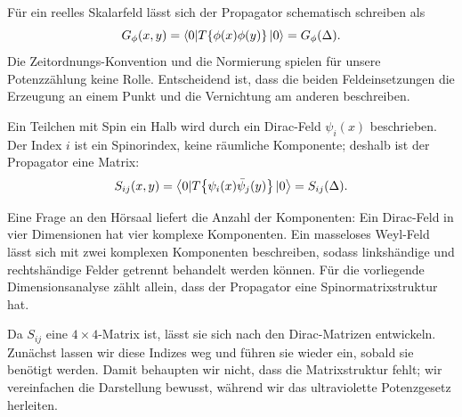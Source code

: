 Für ein reelles Skalarfeld lässt sich der Propagator schematisch schreiben als
\begin{equation}
G_\phi(x,y)=\left\langle0|T\!\left\{\phi(x)\phi(y)\right\}|0\right\rangle
=G_\phi(\Delta).
\end{equation}
Die Zeitordnungs-Konvention und die Normierung spielen für unsere Potenzzählung keine Rolle. Entscheidend ist, dass die beiden Feldeinsetzungen die Erzeugung an einem Punkt und die Vernichtung am anderen beschreiben.

\begin{classroomqa}
\end{classroomqa}

Ein Teilchen mit Spin ein Halb wird durch ein Dirac-Feld \(\psi_i(x)\) beschrieben. Der Index \(i\) ist ein Spinorindex, keine räumliche Komponente; deshalb ist der Propagator eine Matrix:
\begin{equation}
S_{ij}(x,y)=\left\langle0|T\!\left\{\psi_i(x)\bar\psi_j(y)\right\}|0\right\rangle
=S_{ij}(\Delta).
\end{equation}

Eine Frage an den Hörsaal liefert die Anzahl der Komponenten: Ein Dirac-Feld in vier Dimensionen hat vier komplexe Komponenten. Ein masseloses Weyl-Feld lässt sich mit zwei komplexen Komponenten beschreiben, sodass linkshändige und rechtshändige Felder getrennt behandelt werden können. Für die vorliegende Dimensionsanalyse zählt allein, dass der Propagator eine Spinormatrixstruktur hat.

Da \(S_{ij}\) eine \(4\times4\)-Matrix ist, lässt sie sich nach den Dirac-Matrizen entwickeln. Zunächst lassen wir diese Indizes weg und führen sie wieder ein, sobald sie benötigt werden. Damit behaupten wir nicht, dass die Matrixstruktur fehlt; wir vereinfachen die Darstellung bewusst, während wir das ultraviolette Potenzgesetz herleiten.

\begin{classroomqa}
\end{classroomqa}

